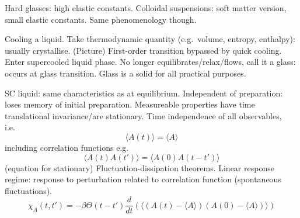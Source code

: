 \documentclass[11pt,twoside]{report}
\def\includebibliography{}
\begin{document}
Hard glasses: high elastic constants.
Colloidal suspensions: soft matter version, small elastic constants.
Same phenomenology though.

Cooling a liquid.
Take thermodynamic quantity (e.g.\ volume, entropy, enthalpy): usually crystallise.
(Picture)
First-order transition bypassed by quick cooling.
Enter supercooled liquid phase.
No longer equilibrates/relax/flows, call it a glass: occurs at glass transition.
Glass is a solid for all practical purposes.

SC liquid: same characteristics as at equilibrium.
Independent of preparation: loses memory of initial preparation.
Measureable properties have time translational invariance/are stationary.
Time independence of all observables, i.e.\
\begin{equation}
  \langle A(t) \rangle = \langle A \rangle
\end{equation}
including correlation functions e.g.\
\begin{equation}
  \langle A(t) A(t') \rangle = \langle A(0) A(t - t') \rangle
\end{equation}
(equation for stationary)
Fluctuation-dissipation theorems.
Linear response regime: response to perturbation related to correlation function (spontaneous fluctuations).
\begin{equation}
  \chi_A (t, t')
  =
  - \beta \Theta(t - t')
  \frac{d}{dt}
  \left(
  \bigg\langle
  (A(t) - \langle A \rangle)
  (A(0) - \langle A \rangle)
  \bigg\rangle
  \right)
\end{equation}

\ifdefined\includebibliography
  \printbibliography
\fi
  
\end{document}
